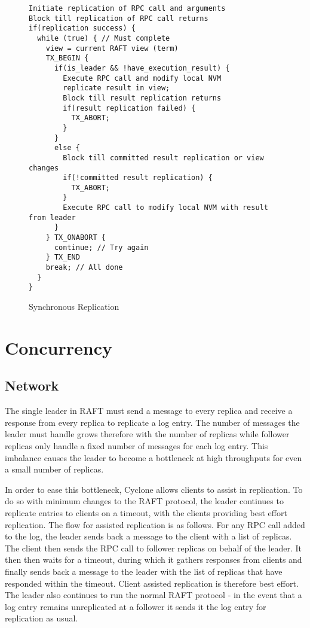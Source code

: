 \documentclass[twocolumn]{article}
\begin{document}
\begin{figure*}
\centering
\begin{minipage}{0.7\textwidth}  
{ \scriptsize
\begin{verbatim}
Initiate replication of RPC call and arguments
Block till replication of RPC call returns
if(replication success) {  
  while (true) { // Must complete 
    view = current RAFT view (term)
    TX_BEGIN {
      if(is_leader && !have_execution_result) {
        Execute RPC call and modify local NVM
        replicate result in view;
        Block till result replication returns
        if(result replication failed) {
          TX_ABORT;
        }
      }
      else {
        Block till committed result replication or view changes
        if(!committed result replication) {
          TX_ABORT;
        }
        Execute RPC call to modify local NVM with result from leader
      }
    } TX_ONABORT {
      continue; // Try again
    } TX_END
    break; // All done
  }
}
\end{verbatim}
}
\end{minipage}
\caption{Synchronous Replication}
\label{fig:sync_rep}
\end{figure*}

\section{Concurrency}
\subsection{Network}
The single leader in RAFT must send a message to every replica and receive a
response from every replica to replicate a log entry. The number of
messages the leader must handle grows therefore with the number of replicas
while follower replicas only handle a fixed number of
messages for each log entry. This imbalance causes the leader to become a
bottleneck at high throughputs for even a small number of replicas.

In order to ease this bottleneck, Cyclone allows clients to assist in
replication. To do so with minimum changes to the RAFT protocol, the leader
continues to replicate entries to clients on a timeout, with the clients
providing best effort replication. The flow for assisted replication is
as follows. For any RPC call added to the log, the leader sends back a message
to the client with a list of replicas. The client then sends the RPC call to
follower replicas on behalf of the leader. It then then waits for a timeout,
during which it gathers responses from clients and finally sends back a message
to the leader with the list of replicas that have responded within the
timeout. Client assisted replication is therefore best effort. The leader also
continues to run the normal RAFT protocol - in the event
that a log entry remains unreplicated at a follower it sends it the log entry
for replication as usual.
\end{document}
